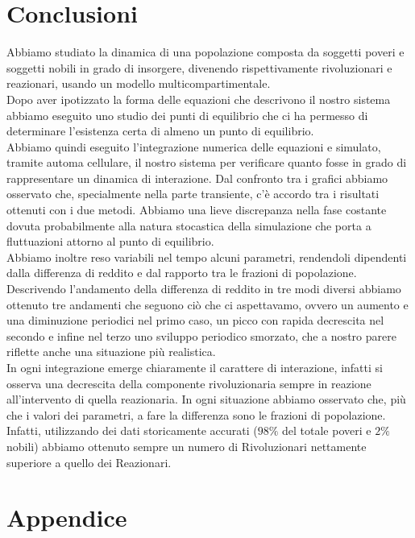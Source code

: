 \section{Conclusioni}
Abbiamo studiato la dinamica di una popolazione composta da soggetti poveri e soggetti nobili in grado di insorgere, divenendo rispettivamente rivoluzionari e reazionari, usando un modello multicompartimentale.\\ Dopo aver ipotizzato la forma delle equazioni che descrivono il nostro sistema abbiamo eseguito uno studio dei punti di equilibrio che ci ha permesso di determinare l'esistenza certa di almeno un punto di equilibrio.\\ Abbiamo quindi eseguito l'integrazione numerica delle equazioni e simulato, tramite automa cellulare, il nostro sistema per verificare quanto fosse in grado di rappresentare un dinamica di interazione. Dal confronto tra i grafici abbiamo osservato che, specialmente nella parte transiente, c'è accordo tra i risultati ottenuti con i due metodi. Abbiamo una lieve discrepanza nella fase costante dovuta probabilmente alla natura stocastica della simulazione che porta a fluttuazioni attorno al punto di equilibrio.\\ Abbiamo inoltre  reso variabili nel tempo alcuni parametri, rendendoli dipendenti dalla differenza di reddito e dal rapporto tra le frazioni di popolazione. Descrivendo l'andamento della differenza di reddito in tre modi diversi abbiamo ottenuto tre andamenti che seguono ciò che ci aspettavamo, ovvero un aumento e una diminuzione periodici nel primo caso, un  picco con rapida decrescita nel secondo e infine nel terzo uno sviluppo periodico smorzato, che a nostro parere riflette anche una situazione più realistica.\\ In ogni integrazione emerge chiaramente il carattere di interazione, infatti si osserva una decrescita della componente rivoluzionaria sempre in reazione all'intervento di quella reazionaria. In ogni situazione abbiamo osservato che, più che i valori dei parametri, a fare la differenza sono le frazioni di popolazione. Infatti, utilizzando dei dati storicamente accurati ($ 98\% $ del totale poveri e $ 2\% $ nobili) abbiamo ottenuto sempre un numero di Rivoluzionari nettamente superiore a quello dei Reazionari. %
\newpage
\appendix
\section*{Appendice}
